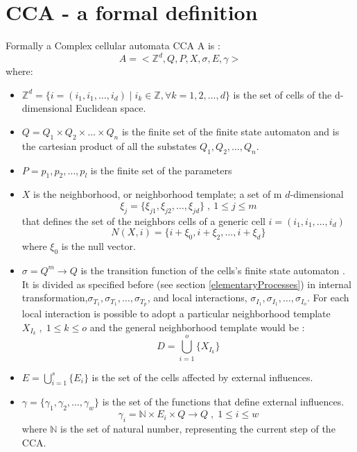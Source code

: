 \section{CCA - a formal definition}\label{mcaFormal}
Formally a Complex cellular automata CCA A is :
\[
A=<\mathbb{Z}^d,Q,P,X,\sigma,E,\gamma>
\]
where:
\begin{itemize}
  \item $\mathbb{Z}^d=\{i=(i_1,i_1,\ldots,i_d)\mid i_k \in
  \mathbb{Z}, \forall k=1,2,\ldots,d \}$ is the set of cells of the d-dimensional
   Euclidean space.
   \item \(Q=Q_1 \times Q_2 \times \ldots \times Q_n \) is the finite set of the
   finite state automaton and is the cartesian product of all the substates
   \(Q_1, Q_2, \ldots ,Q_n \).
   \item \( P=p_1, p_2, \ldots ,p_l \) is the finite set of the
   parameters
  
   \item $X$ is the neighborhood, or neighborhood template; a
  set of m \(d\)-dimensional
  \[\xi_j=\{\xi_{j1},\xi_{j2},\ldots,\xi_{jd}\} \;,\: 1\leq j \leq m\] that
  defines the set of the neighbors cells of a generic cell
  $i=(i_1,i_1,\ldots,i_d)$
  \[
  N(X,i)=\{i+\xi_0,i+\xi_2,\ldots,i+\xi_d\}
  \] where $\xi_0$ is the null vector.
  
  \item $\sigma=Q^m \rightarrow Q $ is the transition
  function of the cells's finite state automaton . It is divided as specified
  before (see section \ref{elementaryProcesses}) in internal
  transformation,\(\sigma_{T_{1}},\sigma_{T_{1}},\ldots,\sigma_{T_{p}}\), and
  local interactions, \(\sigma_{I_{1}},\sigma_{I_{1}},\ldots,\sigma_{I_{o}}\).
  For each local interaction is possible to adopt a particular neighborhood
  template \(X_{I_k} \;,\; 1 \leq k \leq o \) and the general neighborhood
  template would be : 
\[
   D=\bigcup_{i=1}^{o}\{X_{I_k}\}
\]

\item \(E=\bigcup_{i=1}^{s}\{E_i\} \) is the set of the cells affected by
external influences.

\item \(\gamma=\{\gamma_1,\gamma_2,\ldots,\gamma_w\}\) is the set of the
functions that define external influences.
\[
\gamma_i= \mathbb{N} \times E_i \times Q \rightarrow Q \;,\; 1 \leq i \leq w
\]
where \(\mathbb{N}\) is the set of natural number, representing the current
step of the CCA.
  
  
\end{itemize}

